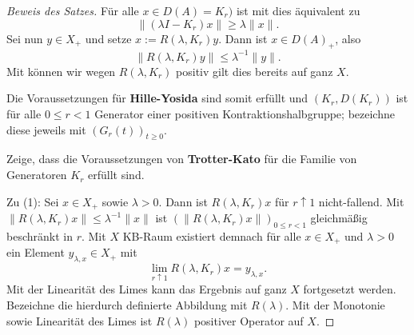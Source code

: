 \begin{proof}[Beweis des Satzes]
\par
Für alle $x\in D(A)=K_r)$ ist mit  dies äquivalent zu 
\begin{equation*}\label{equation1}
\|(\lambda I - K_r)x\|
\geq \lambda \|x\|.
\end{equation*}
Sei nun $y\in X_+$ und setze $x:=R(\lambda, K_r)y$. Dann ist $x\in D(A)_+$, also
\begin{equation}\label{Resolvente von K_r ist relativ beschränkt}
\|R(\lambda, K_r)y\|\leq \lambda^{-1}\|y\|.
\end{equation}
Mit  können wir wegen  $R(\lambda, K_r)$ positiv gilt dies bereits auf ganz $X$.



\par
Die Voraussetzungen für \textbf{Hille-Yosida} sind somit erfüllt und  $(K_r, D(K_r))$ ist für alle $0\leq r< 1$ Generator einer positiven Kontraktionshalbgruppe; bezeichne diese jeweils mit  $(G_r(t))_{t\geq0}$.

\par
Zeige, dass die Voraussetzungen von \textbf{Trotter-Kato} für die Familie von Generatoren $K_r$ erfüllt sind.

\par
Zu (1): Sei $x\in X_+$ sowie  $\lambda >0$. Dann ist $R(\lambda, K_r)x$ für $r\uparrow 1$ nicht-fallend. Mit $\|R(\lambda, K_r)x\|\leq \lambda^{-1}\|x\|$ ist $(\|R(\lambda, K_r)x\|)_{0\leq r<1}$ gleichmäßig beschränkt in $r$. Mit $X$ KB-Raum existiert demnach für alle $x\in X_+$ und $\lambda >0$ ein Element $y_{\lambda, x}\in X_+$ mit
\begin{equation}\label{Grenzwert der Resolventen}
\lim_{r\uparrow 1}R(\lambda, K_r)x = y_{\lambda, x}.
\end{equation}
Mit der Linearität des Limes kann das Ergebnis auf ganz $X$ fortgesetzt werden. Bezeichne die hierdurch definierte Abbildung mit $R(\lambda)$. Mit der Monotonie sowie Linearität des Limes ist $R(\lambda)$ positiver Operator auf $X$.


\end{proof}
